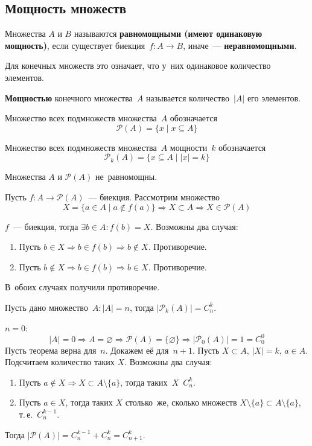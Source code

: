 \subsection{Мощность множеств}
Множества $A$ и $B$ называются \textbf{равномощными (имеют одинаковую мощность)}, если существует биекция~$f \colon A \to B$, иначе~--- \textbf{неравномощными}.

Для конечных множеств это означает, что у~них одинаковое количество элементов.

\textbf{Мощностью} конечного множества~$A$ называется количество~$|A|$ его элементов.

Множество всех подмножеств множества~$A$ обозначается
\[ \mathcal P(A) = \{ x \mid x \subseteq A \} \]

Множество всех подмножеств множества~$A$ мощности~$k$ обозначается
\[ \mathcal P_k(A) = \{ x \subseteq A \mid |x| = k \} \]

\begin{theorem}[Кантора]
Множества $A$ и $\mathcal P(A)$ не~равномощны.
\end{theorem}
\begin{proofcontra}
Пусть $f \colon A \to \mathcal P(A)$~--- биекция. Рассмотрим множество
\[ X = \{ a \in A \mid a \notin f(a) \} \Rightarrow X \subset A \Rightarrow X \in \mathcal P(A) \]

$f$~--- биекция, тогда $\exists b \in A \colon f(b) = X$.
Возможны два случая:
\begin{enumerate}
	\item Пусть $b \in X \Rightarrow b \in f(b) \Rightarrow b \notin X$.
	Противоречие.
	\item Пусть $b \notin X \Rightarrow b \in f(b) \Rightarrow b \in X$.
	Противоречие.
\end{enumerate}

В~обоих случаях получили противоречие.
\end{proofcontra}

\begin{theorem}
Пусть дано множество~$A \colon |A| = n$, тогда $|\mathcal P_k(A)| = C_n^k$.
\end{theorem}
\begin{proofmathind}
	\indbase $n = 0$:
	\[ |A| = 0 \Rightarrow A = \varnothing \Rightarrow \mathcal P(A) = \{ \varnothing \} \Rightarrow |\mathcal P_0(A)| = 1 = C_0^0 \]
	\indstep Пусть теорема верна для~$n$.
	Докажем её для~$n + 1$.
	Пусть $X \subset A$, $|X| = k$, $a \in A$.
	Подсчитаем количество таких $X$.
	Возможны два случая:
	\begin{enumerate}
		\item Пусть $a \notin X \Rightarrow X \subset A \setminus \{ a \}$, тогда таких~$X$~$C_n^k$.
		\item Пусть $a \in X$, тогда таких $X$ столько~же, сколько множеств
		$X \setminus \{ a \} \subset A \setminus \{ a \}$, т.\,е.~$C_n^{k-1}$.
	\end{enumerate}

	Тогда $|\mathcal P(A)| = C_n^{k-1} + C_n^k = C_{n+1}^k$. \indend

\end{proofmathind}